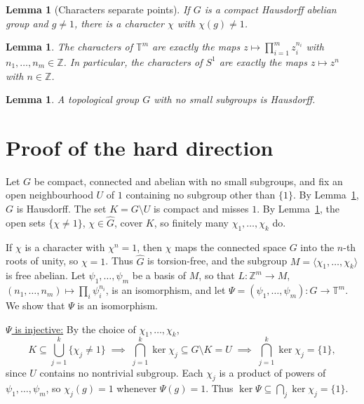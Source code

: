 \documentclass[11pt]{article}
\newtheorem{lemma}[theorem]{Lemma}
\newcommand{\T}{\mathbb{T}}
\newcommand{\Z}{\mathbb{Z}}
\newcommand{\Ghat}{\widehat{G}}
\begin{document}
\begin{lemma}[Characters separate points]\label{lem:sep}
If $G$ is a compact Hausdorff abelian group and $g \neq 1$, there is a character $\chi$ with $\chi(g) \neq 1$.
\end{lemma}

\begin{lemma}\label{lem:chars}
The characters of $\T^m$ are exactly the maps $z \mapsto \prod_{i=1}^m z_i^{n_i}$ with $n_1, \dots, n_m \in \Z$. In particular, the characters of $S^1$ are exactly the maps $z \mapsto z^n$ with $n \in \Z$.
\end{lemma}

\begin{lemma}\label{lem:t2}
A topological group $G$ with no small subgroups is Hausdorff.
\end{lemma}

\section{Proof of the hard direction}\label{sec:thm}

Let $G$ be compact, connected and abelian with no small subgroups, and fix an open neighbourhood $U$ of $1$ containing no subgroup other than $\{1\}$. By Lemma~\ref{lem:t2}, $G$ is Hausdorff.
The set $K = G \setminus U$ is compact and misses $1$. By Lemma~\ref{lem:sep}, the open sets $\{\chi \neq 1\}$, $\chi \in \Ghat$, cover $K$, so finitely many $\chi_1, \dots, \chi_k$ do.

If $\chi$ is a character with $\chi^n = 1$, then $\chi$ maps the connected space $G$ into the $n$-th roots of unity, so $\chi = 1$. Thus $\Ghat$ is torsion-free, and the subgroup $M = \langle \chi_1, \dots, \chi_k \rangle$ is free abelian. Let $\psi_1, \dots, \psi_m$ be a basis of $M$, so that $L\colon \Z^m \to M$, $(n_1, \dots, n_m) \mapsto \prod_i \psi_i^{n_i}$, is an isomorphism, and let $\Psi = (\psi_1, \dots, \psi_m)\colon G \to \T^m$. We show that $\Psi$ is an isomorphism.

\uline{$\Psi$ is injective:} By the choice of $\chi_1, \dots, \chi_k$,
\[
  K \subseteq \bigcup_{j=1}^k \{\chi_j \neq 1\}
  \;\implies\; \bigcap_{j=1}^k \ker\chi_j \subseteq G \setminus K = U
  \;\implies\; \bigcap_{j=1}^k \ker\chi_j = \{1\},
\]
since $U$ contains no nontrivial subgroup. Each $\chi_j$ is a product of powers of $\psi_1, \dots, \psi_m$, so $\chi_j(g) = 1$ whenever $\Psi(g) = 1$. Thus $\ker\Psi \subseteq \bigcap_j \ker\chi_j = \{1\}$.
\end{document}
